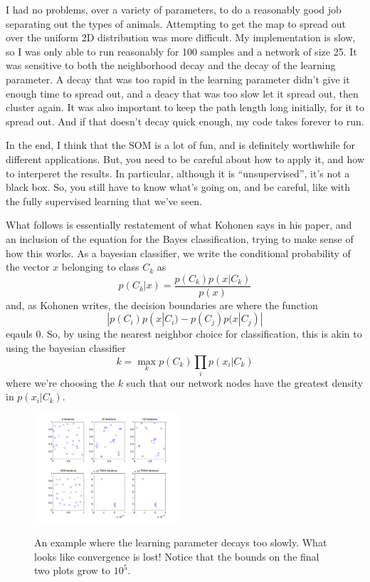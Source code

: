 \documentclass[pre,twocolumn,twoside,byrevtex,superscriptaddress]{revtex4}
\begin{document}
I had no problems, over a variety of parameters, to do a reasonably good job separating out the types of animals.
Attempting to get the map to spread out over the uniform 2D distribution was more difficult.
My implementation is slow, so I was only able to run reasonably for 100 samples and a network of size 25.
It was sensitive to both the neighborhood decay and the decay of the learning parameter.
A decay that was too rapid in the learning parameter didn't give it enough time to spread out, and a deacy that was too slow let it spread out, then cluster again.
It was also important to keep the path length long initially, for it to spread out.
And if that doesn't decay quick enough, my code takes forever to run.

In the end, I think that the SOM is a lot of fun, and is definitely worthwhile for different applications.
But, you need to be careful about how to apply it, and how to interperet the results.
In particular, although it is ``unsupervised'', it's not a black box.
So, you still have to know what's going on, and be careful, like with the fully supervised learning that we've seen.

What follows is essentially restatement of what Kohonen says in his paper, and an inclusion of the equation for the Bayes classification, trying to make sense of how this works.
As a bayesian classifier, we write the conditional probability of the vector $x$ belonging to class $C_k$ as
\begin{equation}
  p(C_k|x) = \frac{p(C_k)p(x|C_k)}{p(x)}
\end{equation}
and, as Kohonen writes, the decision boundaries are where the function
\begin{equation}
  | p(C_i)p(x|C_i) - p(C_j)p(x|C_j) |
\end{equation}
eqauls 0.
So, by using the nearest neighbor choice for classification, this is akin to using the bayesian classifier
\begin{equation}
  k = \max_k p(C_k) \prod _i p(x_i|C_k)
\end{equation}
where we're choosing the $k$ such that our network nodes have the greatest density in $p(x_i|C_k)$.

\begin{figure}
 \centering
  \includegraphics[width=0.48\textwidth]{figures/SOM_uniform_dist_covering_long.png}
  \label{fig:2}
  \caption{An example where the learning parameter decays too slowly. What looks like convergence is lost! Notice that the bounds on the final two plots grow to $10^5$.}
\end{figure}
\end{document}
